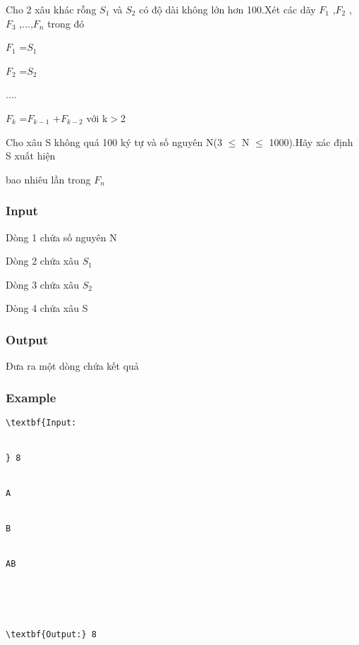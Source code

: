 



   Cho 2 xâu khác rỗng $S_{1}$   và $S_{2}$   có độ dài không lớn hơn 100.Xét các dãy $F_{1}$   ,$F_{2}$   ,$F_{3}$   ,...,$F_{n}$   trong đó   


   $F_{1}$   =$S_{1}$


   $F_{2}$   =$S_{2}$


   ....   


   $F_{k}$   =$F_{k-1}$   +$F_{k-2}$   với k$>$2   


   Cho xâu S không quá 100 ký tự và số nguyên N(3 $\le$ N $\le$ 1000).Hãy xác định S xuất hiện   


   bao nhiêu lần trong $F_{n}$










\subsubsection{   Input  }

   Dòng 1 chứa số nguyên N  

   Dòng 2 chứa xâu $S_{1}$

   Dòng 3 chứa xâu $S_{2}$

   Dòng 4 chứa xâu S  

\subsubsection{   Output  }

   Đưa ra một dòng chứa kết quả  

\subsubsection{   Example  }
\begin{verbatim}
\textbf{Input:


} 8


A


B


AB





\textbf{Output:} 8 \end{verbatim}
